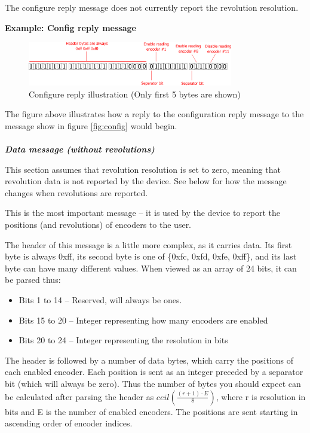 \documentclass[twoside]{article}
\begin{document}
The configure reply message does not currently report the revolution resolution.

\textbf{Example: Config reply message}
\begin{figure}[h!]
	\centering
	\includegraphics[width=0.8\textwidth]{figs/reply1}
	\caption{Configure reply illustration (Only first 5 bytes are shown)}
	\label{fig:JpgEpsCompare}
\end{figure}

The figure above illustrates how a reply to the configuration reply message to the message show in figure \ref{fig:config} would begin. \\\\

\noindent{}\emph{\textbf{Data message (without revolutions)}}

This section assumes that revolution resolution is set to zero, meaning that revolution data is not reported by the device. See below for how the message changes when revolutions are reported.

This is the most important message -- it is used by the device to report the positions (and revolutions) of encoders to the user.

The header of this message is a little more complex, as it carries data. Its first byte is always 0xff, its second byte is one of \{0xfc, 0xfd, 0xfe, 0xff\}, and its last byte can have many different values. When viewed as an array of 24 bits, it can be parsed thus:

\begin{itemize}
\item Bits 1 to 14 -- Reserved, will always be ones.
\item Bits 15 to 20 -- Integer representing how many encoders are enabled
\item Bits 20 to 24 -- Integer representing the resolution in bits
\end{itemize}

The header is followed by a number of data bytes, which carry the positions of each enabled encoder. Each position is sent as an integer preceded by a separator bit (which will always be zero). Thus the number of bytes you should expect can be calculated after parsing the header as $ceil(\frac{(r+1)\cdot{}E}{8})$, where r is resolution in bits and E is the number of enabled encoders. The positions are sent starting in ascending order of encoder indices.
\end{document}
